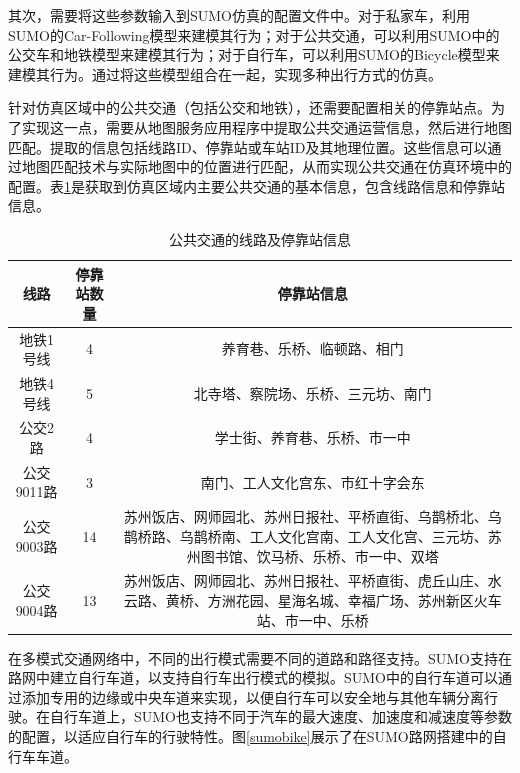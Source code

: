 其次，需要将这些参数输入到SUMO仿真的配置文件中。对于私家车，利用SUMO的Car-Following模型来建模其行为；对于公共交通，可以利用SUMO中的公交车和地铁模型来建模其行为；对于自行车，可以利用SUMO的Bicycle模型来建模其行为。通过将这些模型组合在一起，实现多种出行方式的仿真。

针对仿真区域中的公共交通（包括公交和地铁），还需要配置相关的停靠站点。为了实现这一点，需要从地图服务应用程序中提取公共交通运营信息，然后进行地图匹配。提取的信息包括线路ID、停靠站或车站ID及其地理位置。这些信息可以通过地图匹配技术与实际地图中的位置进行匹配，从而实现公共交通在仿真环境中的配置。表\ref{public_inf}是获取到仿真区域内主要公共交通的基本信息，包含线路信息和停靠站信息。

\renewcommand{\arraystretch}{1.2} %
\begin{table}[htbp]
\centering
\caption{公共交通的线路及停靠站信息}
\label{public_inf}
\begin{tabular}{ccc}
\toprule
线路 & 停靠站数量  & 停靠站信息      \\
\midrule
地铁1号线           & 4            & \parbox[t]{8.5cm}{养育巷、乐桥、临顿路、相门}                        \\
地铁4号线           & 5           & \parbox[t]{8.5cm}{北寺塔、察院场、乐桥、三元坊、南门}                 \\ 
公交2路             & 4       & \parbox[t]{8.5cm}{学士街、养育巷、乐桥、市一中}                \\
公交9011路             & 3      & \parbox[t]{8.5cm}{南门、工人文化宫东、市红十字会东}                \\
公交9003路             & 14       & \parbox[t]{8.5cm}{苏州饭店、网师园北、苏州日报社、平桥直街、乌鹊桥北、乌鹊桥路、乌鹊桥南、工人文化宫南、工人文化宫、三元坊、苏州图书馆、饮马桥、乐桥、市一中、双塔}                \\
公交9004路             & 13       & \parbox[t]{8.5cm}{苏州饭店、网师园北、苏州日报社、平桥直街、虎丘山庄、水云路、黄桥、方洲花园、星海名城、幸福广场、苏州新区火车站、市一中、乐桥}                \\
\bottomrule
\end{tabular}
\end{table}

在多模式交通网络中，不同的出行模式需要不同的道路和路径支持。SUMO支持在路网中建立自行车道，以支持自行车出行模式的模拟。SUMO中的自行车道可以通过添加专用的边缘或中央车道来实现，以便自行车可以安全地与其他车辆分离行驶。在自行车道上，SUMO也支持不同于汽车的最大速度、加速度和减速度等参数的配置，以适应自行车的行驶特性。图\ref{sumobike}展示了在SUMO路网搭建中的自行车车道。

